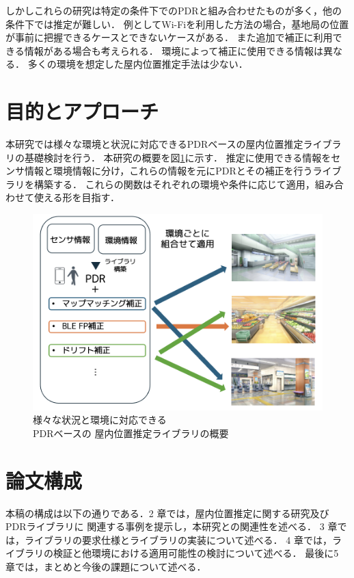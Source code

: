 しかしこれらの研究は特定の条件下でのPDRと組み合わせたものが多く，他の条件下では推定が難しい．
例としてWi-Fiを利用した方法の場合，基地局の位置が事前に把握できるケースとできないケースがある．
また追加で補正に利用できる情報がある場合も考えられる．
環境によって補正に使用できる情報は異なる．
多くの環境を想定した屋内位置推定手法は少ない．

\section{目的とアプローチ}

本研究では様々な環境と状況に対応できるPDRベースの屋内位置推定ライブラリの基礎検討を行う．
本研究の概要を図\ref{fig:overview}に示す．
推定に使用できる情報をセンサ情報と環境情報に分け，これらの情報を元にPDRとその補正を行うライブラリを構築する．
これらの関数はそれぞれの環境や条件に応じて適用，組み合わせて使える形を目指す．

\begin{figure}[h]
	\centering
	\includegraphics[width=120mm]{image/first.png}
	\caption{様々な状況と環境に対応できる\\PDRベースの
		屋内位置推定ライブラリの概要}    \label{fig:overview}
\end{figure}

\section{論文構成}
本稿の構成は以下の通りである．2 章では，屋内位置推定に関する研究及びPDRライブラリに
関連する事例を提示し，本研究との関連性を述べる．
3 章では，ライブラリの要求仕様とライブラリの実装について述べる．
4 章では，ライブラリの検証と他環境における適用可能性の検討について述べる．
最後に5 章では，まとめと今後の課題について述べる．


